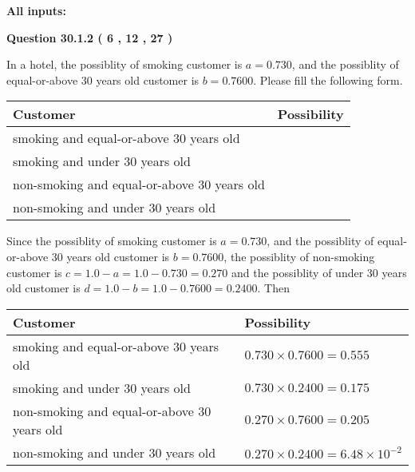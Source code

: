 \documentclass[12pt]{article}
\begin{document}
   
   
   
\noindent{}
   
   
   
   
\noindent\vspace{0.1in}\hspace{-0.08in} {\textbf{\Large{All inputs: }}}
   
   
  
\vspace{0.2in}
  
{\textbf{\Large{Question
30.1.2 
 (           6 ,          12 ,          27 )
}}}
  
  
In a hotel, the possiblity of  %
smoking customer is
$a =  %
0.730$, and the possiblity of  %
equal-or-above 30 years old customer is $ b =  %
0.7600$.
Please fill the following form.
 
\noindent
\begin{tabular}{|l|l|}
\hline
Customer & Possibility \\
\hline
smoking  and   %
equal-or-above 30 years old  & \\
\hline
smoking  and   %
under 30 years old & \\
\hline
 non-smoking and   %
equal-or-above 30 years old  & \\
\hline
 non-smoking and  %
under 30 years old & \\
\hline
\end{tabular}
 
 
 
 
 
\noindent{}
 
 

Since the possiblity of  %
smoking customer is $ a =  %
0.730 $,
and the possiblity of  %
equal-or-above 30 years old customer is $ b =  %
0.7600 $,
the possiblity of  %
non-smoking customer is $ c = 1.0 - a = 1.0 -
0.730
=  %
0.270 $ and the possiblity of  %
under 30 years old
customer is $ d = 1.0 - b = 1.0 -  %
0.7600 =  %
0.2400  $.
Then
 
\noindent
\begin{tabular}{|l|l|}
\hline
Customer & Possibility \\
\hline
smoking  and  %
equal-or-above 30 years old  &
  $ %
0.730 \times  %
0.7600 =  %
0.555$ \\
\hline
smoking  and  %
under 30 years old &
  $ %
0.730 \times  %
0.2400 =  %
0.175$ \\
\hline
 non-smoking and  %
equal-or-above 30 years old  &
  $ %
0.270 \times  %
0.7600 =  %
0.205$ \\
\hline
 non-smoking and  %
under 30 years old &
  $ %
0.270 \times  %
0.2400 =  %
6.48 \times 10^{-2}$ \\
\hline
\end{tabular}
 
\end{document}
